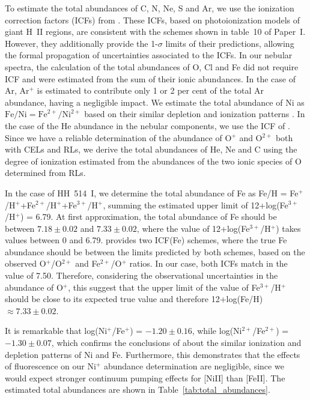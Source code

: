 \documentclass[fleqn,usenatbib]{mnras}
\begin{document}
To estimate the total abundances of C, N, Ne, S and Ar, we use the ionization correction factors (ICFs) from \citet{Amayo2021}. These ICFs, based on photoionization models of giant H~II regions, are consistent with the schemes shown in table~10 of Paper~I. However, they additionally provide the 1-$\sigma$ limits of their predictions, allowing the formal propagation of uncertainties associated to the ICFs. In our nebular spectra, the calculation of the total abundances of O, Cl and Fe did not require ICF and were estimated from the sum of their ionic abundances. In the case of Ar, Ar$^+$ is estimated to contribute only 1 or 2 per cent of the total Ar abundance, having a negligible impact. We estimate the total abundance of Ni as $\text{Fe/Ni}=\text{Fe}^{2+}/\text{Ni}^{2+}$ based on their similar depletion and ionization patterns \citep[][]{mendez2021-2}. In the case of the He abundance in the nebular components, we use the ICF of \citet{kunthsargent83}. Since we have a reliable determination of the abundance of O$^+$ and O$^{2+}$ both with CELs and RLs, we derive the total abundances of He, Ne and C using the degree of ionization estimated from the abundances of the two ionic species of O determined from RLs. 


In the case of HH~514~I, we determine the total abundance of Fe as Fe/H = Fe$^{+}$/H$^{+}$+Fe$^{2+}$/H$^{+}$+Fe$^{3+}$/H$^{+}$, summing the estimated upper limit of 12+log(Fe$^{3+}$/H$^{+}$) = 6.79. At first approximation, the total abundance of Fe should be between $7.18 \pm 0.02$ and $7.33 \pm 0.02$, where the value of 12+log(Fe$^{3+}$/H$^{+}$) takes values between 0 and 6.79.  \citet{rodriguez05} provides two ICF(Fe) schemes, where the true Fe abundance should be between the limits predicted by both schemes, based on the observed O$^{+}$/O$^{2+}$ and Fe$^{2+}$/O$^{+}$ ratios. In our case, both ICFs match in the value of 7.50. Therefore, considering the observational uncertainties in the abundance of O$^{+}$, this suggest that the upper limit of the value of Fe$^{3+}$/H$^{+}$ should be close to its expected true value and therefore 12+log(Fe/H)$\approx 7.33 \pm 0.02$. 

It is remarkable that log(Ni$^{+}$/Fe$^{+}$) = $-1.20 \pm 0.16$, while log(Ni$^{2+}$/Fe$^{2+}$) = $-1.30 \pm 0.07$, which confirms the conclusions of \citet{mendez2021-2} about the similar ionization and depletion patterns of Ni and Fe. Furthermore, this demonstrates that the effects of fluorescence on our Ni$^{+}$ abundance determination are negligible, since we would expect stronger continuum pumping effects for [Ni\thinspace II] than [Fe\thinspace II]. The estimated total abundances are shown in Table~\ref{tab:total_abundances}.
\end{document}
